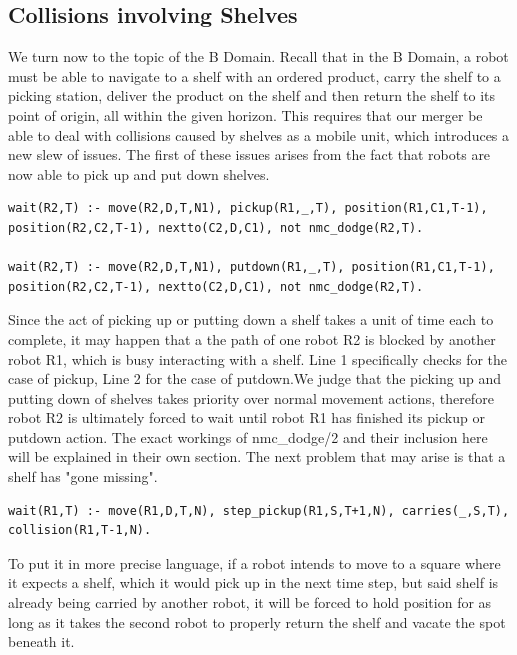 \documentclass{llncs}
\begin{document}
\subsection{Collisions involving Shelves}
We turn now to the topic of the B Domain. Recall that in the B Domain, a robot must be able to navigate to a shelf with an ordered product, carry the shelf to a picking station, deliver the product on the shelf and then return the shelf to its point of origin, all within the given horizon. This requires that our merger be able to deal with collisions caused by shelves as a mobile unit, which introduces a new slew of issues.\newline\newline
The first of these issues arises from the fact that robots are now able to pick up and put down shelves.
\begin{lstlisting}[basicstyle=\fontsize{9}{11}\selectfont\ttfamily,frame=single,breaklines=true]
wait(R2,T) :- move(R2,D,T,N1), pickup(R1,_,T), position(R1,C1,T-1), position(R2,C2,T-1), nextto(C2,D,C1), not nmc_dodge(R2,T).

wait(R2,T) :- move(R2,D,T,N1), putdown(R1,_,T), position(R1,C1,T-1), position(R2,C2,T-1), nextto(C2,D,C1), not nmc_dodge(R2,T).
\end{lstlisting}
Since the act of picking up or putting down a shelf takes a unit of time each to complete, it may happen that a the path of one robot R2 is blocked by another robot R1, which is busy interacting with a shelf. Line 1 specifically checks for the case of pickup, Line 2 for the case of putdown.\newline We judge that the picking up and putting down of shelves takes priority over normal movement actions, therefore robot R2 is ultimately forced to wait until robot R1 has finished its pickup or putdown action. The exact workings of nmc\_dodge/2 and their inclusion here will be explained in their own section. \newline\newline
The next problem that may arise is that a shelf has "gone missing". 
\begin{lstlisting}[basicstyle=\fontsize{9}{11}\selectfont\ttfamily,frame=single,breaklines=true]
wait(R1,T) :- move(R1,D,T,N), step_pickup(R1,S,T+1,N), carries(_,S,T), collision(R1,T-1,N).
\end{lstlisting}
To put it in more precise language, if a robot intends to move to a square where it expects a shelf, which it would pick up in the next time step, but said shelf is already being carried by another robot, it will be forced to hold position for as long as it takes the second robot to properly return the shelf and vacate the spot beneath it.\newpage
\end{document}
